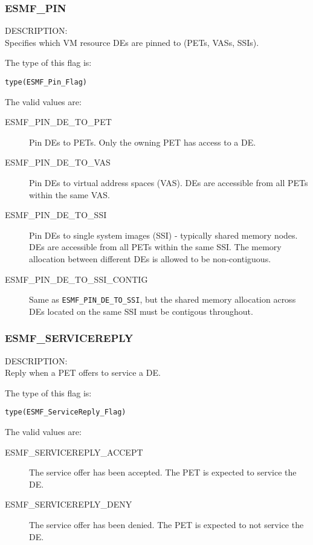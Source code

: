 

\subsubsection{ESMF\_PIN}
\label{const:pin_flag}

{\sf DESCRIPTION:\\}
Specifies which VM resource DEs are pinned to (PETs, VASs, SSIs).

The type of this flag is:

{\tt type(ESMF\_Pin\_Flag)}

The valid values are:
\begin{description}
  \item [ESMF\_PIN\_DE\_TO\_PET] 
    Pin DEs to PETs. Only the owning PET has access to a DE.
  \item [ESMF\_PIN\_DE\_TO\_VAS]
    Pin DEs to virtual address spaces (VAS). DEs are accessible from all PETs
    within the same VAS.
  \item [ESMF\_PIN\_DE\_TO\_SSI]
    Pin DEs to single system images (SSI) - typically shared memory nodes.
    DEs are accessible from all PETs within the same SSI. The memory allocation
    between different DEs is allowed to be non-contiguous.
  \item [ESMF\_PIN\_DE\_TO\_SSI\_CONTIG]
    Same as {\tt ESMF\_PIN\_DE\_TO\_SSI}, but the shared memory allocation
    across DEs located on the same SSI must be contigous throughout.
\end{description}


\subsubsection{ESMF\_SERVICEREPLY}
\label{const:servicereply_flag}

{\sf DESCRIPTION:\\}
Reply when a PET offers to service a DE.

The type of this flag is:

{\tt type(ESMF\_ServiceReply\_Flag)}

The valid values are:
\begin{description}
  \item [ESMF\_SERVICEREPLY\_ACCEPT] 
    The service offer has been accepted. The PET is expected to service the DE.
  \item [ESMF\_SERVICEREPLY\_DENY]
    The service offer has been denied. The PET is expected to not service the
    DE.
\end{description}

